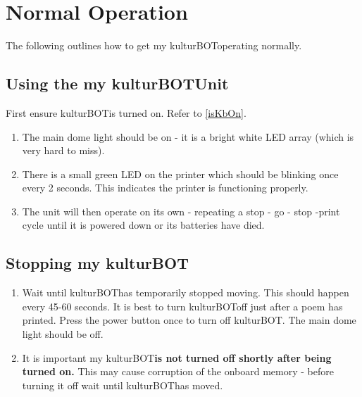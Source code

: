 \documentclass[]{article}
\newcommand{\kb}{kulturBOT}
\newcommand{\kbspace}{\kb \space}
\newcommand{\mykb}{my \kb}
\newcommand{\mykbspace}{\mykb \space}
\begin{document}
\section{Normal Operation}
The following outlines how to get \mykbspace operating normally.


\subsection{Using the \mykbspace Unit}
\label{connect2kb}
First ensure \kbspace is turned on. Refer to \ref{isKbOn}.

\begin{enumerate}
	\item The main dome light should be on - it is a bright white LED array (which is very hard to miss).
	\item There is a small green LED on the printer which should be blinking once every 2 seconds. This indicates the printer is functioning properly.
	\item The unit will then operate on its own - repeating a stop - go - stop -print cycle until it is powered down or its batteries have died.
\end{enumerate}

\subsection{Stopping \mykb}
\label{stoppingKb}
\begin{enumerate}
\item Wait until \kbspace has temporarily stopped moving. This should happen every 45-60 seconds. It is best to turn \kbspace off just after a poem has printed. Press the power button once to turn off \kb. The main dome light should be off.
\item It is important \mykbspace \textbf{is not turned off shortly after being turned on.} This may cause corruption of the onboard memory - before turning it off wait until \kbspace has moved.

\end{enumerate}


\end{document}
